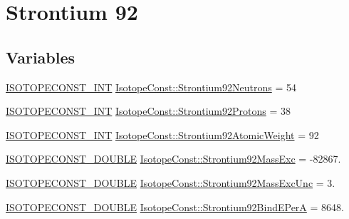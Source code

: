 \hypertarget{group___isotope_const-_strontium-_sr92}{}\section{Strontium 92}
\label{group___isotope_const-_strontium-_sr92}
\subsection*{Variables}
\begin{DoxyCompactItemize}
\item 
\mbox{\hyperlink{group___isotope_const-_macros_ga5f18360b3e99483a35c32d789e62621c}{I\+S\+O\+T\+O\+P\+E\+C\+O\+N\+S\+T\+\_\+\+I\+NT}} \mbox{\hyperlink{group___isotope_const-_strontium-_sr92_ga0f658e5863ecad69a2f6fabb8886d782}{Isotope\+Const\+::\+Strontium92\+Neutrons}} = 54
\item 
\mbox{\hyperlink{group___isotope_const-_macros_ga5f18360b3e99483a35c32d789e62621c}{I\+S\+O\+T\+O\+P\+E\+C\+O\+N\+S\+T\+\_\+\+I\+NT}} \mbox{\hyperlink{group___isotope_const-_strontium-_sr92_gae094fec1cdf0a64b0b734da75d2ff516}{Isotope\+Const\+::\+Strontium92\+Protons}} = 38
\item 
\mbox{\hyperlink{group___isotope_const-_macros_ga5f18360b3e99483a35c32d789e62621c}{I\+S\+O\+T\+O\+P\+E\+C\+O\+N\+S\+T\+\_\+\+I\+NT}} \mbox{\hyperlink{group___isotope_const-_strontium-_sr92_ga2d76ab431e9a98eccf8a4836bd4135e6}{Isotope\+Const\+::\+Strontium92\+Atomic\+Weight}} = 92
\item 
\mbox{\hyperlink{group___isotope_const-_macros_ga8f45a7272ce02c0b4c65c44636ed719a}{I\+S\+O\+T\+O\+P\+E\+C\+O\+N\+S\+T\+\_\+\+D\+O\+U\+B\+LE}} \mbox{\hyperlink{group___isotope_const-_strontium-_sr92_gac0f53467afe66ca08f98172050ae32b9}{Isotope\+Const\+::\+Strontium92\+Mass\+Exc}} = -\/82867.
\item 
\mbox{\hyperlink{group___isotope_const-_macros_ga8f45a7272ce02c0b4c65c44636ed719a}{I\+S\+O\+T\+O\+P\+E\+C\+O\+N\+S\+T\+\_\+\+D\+O\+U\+B\+LE}} \mbox{\hyperlink{group___isotope_const-_strontium-_sr92_gaddc66692411d13dd02e03ec84b94b60e}{Isotope\+Const\+::\+Strontium92\+Mass\+Exc\+Unc}} = 3.
\item 
\mbox{\hyperlink{group___isotope_const-_macros_ga8f45a7272ce02c0b4c65c44636ed719a}{I\+S\+O\+T\+O\+P\+E\+C\+O\+N\+S\+T\+\_\+\+D\+O\+U\+B\+LE}} \mbox{\hyperlink{group___isotope_const-_strontium-_sr92_gaf5244e3f81426f11cab5be55189d0131}{Isotope\+Const\+::\+Strontium92\+Bind\+E\+PerA}} = 8648.
\item 

\end{DoxyCompactItemize}
